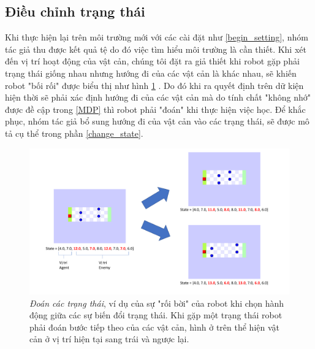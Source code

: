 \subsection{Điều chỉnh trạng thái}
Khi thực hiện lại trên môi trường mới với các cài đặt như \ref{begin_setting}, nhóm tác giả thu được kết quả tệ do đó việc tìm hiểu môi trường là cần thiết. Khi xét đến vị trí hoạt động của vật cản, chúng tôi đặt ra giả thiết khi robot gặp phải trạng thái giống nhau nhưng hướng đi của các vật cản là khác nhau, sẽ khiến robot "bối rối"  được biểu thị như hình \ref{fig:conflict_enemy_position} . Do đó khi ra quyết định trên dữ kiện hiện thời sẽ phải xác định hướng đi của các vật cản mà do tính chất "không nhớ" được đề cập trong \ref{MDP} thì robot phải "đoán" khi thực hiện việc học. Để khắc phục, nhóm tác giả bổ sung hướng đi của vật cản vào các trạng thái, sẽ được mô tả cụ thể trong phần \ref{change_state}.\\
\begin{figure}[h]
    \centering
    \includegraphics[width=150mm,scale=0.5]{./Pic/conflict_enemy_position.pdf}
    \caption[Đoán các trạng thái]{\textit{Đoán các trạng thái}, ví dụ của sự "rối bời" của robot khi chọn hành động giữa các sự biến đổi trạng thái. Khi gặp một trạng thái robot phải đoán bước tiếp theo của các vật cản, hình ở trên thể hiện vật cản ở vị trí hiện tại sang trái và ngược lại.}
    \label{fig:conflict_enemy_position}
\end{figure}

